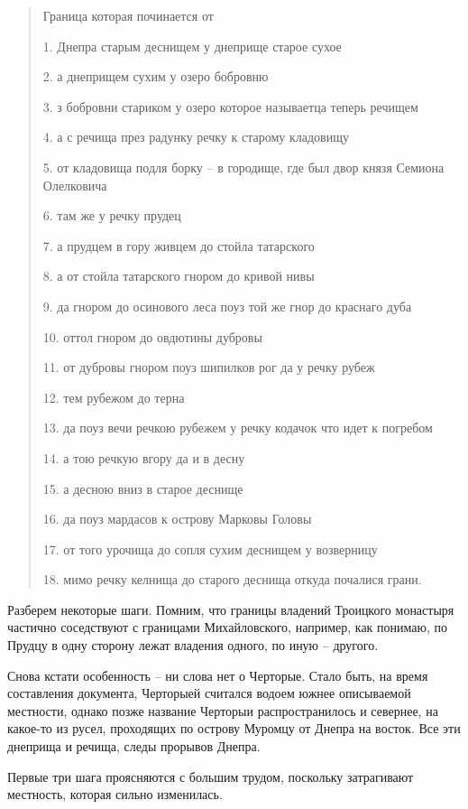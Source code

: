\begin{quotation}
Граница которая починается от 

1. Днепра старым деснищем у днеприще старое сухое

2. а днеприщем сухим у озеро бобровню 

3. з бобровни стариком у озеро которое называетца теперь речищем 

4. а с речища през радунку речку к старому кладовищу 

5. от кладовища подля борку – в городище, где был двор князя Семиона Олелковича

6. там же у речку прудец

7. а прудцем в гору живцем до стойла татарского

8. а от стойла татарского гнором до кривой нивы

9. да гнором до осинового леса поуз той же гнор до краснаго дуба

10. оттол гнором до овдютины дубровы

11. от дубровы гнором поуз шипилков рог да у речку рубеж

12. тем рубежом до терна

13. да поуз вечи речкою рубежем у речку кодачок что идет к погребом

14. а тою речкую вгору да и в десну

15. а десною вниз в старое деснище

16. да поуз мардасов к острову Марковы Головы

17. от того урочища до сопля сухим деснищем у возверницу 

18. мимо речку келнища до старого деснища откуда почалися грани.
\end{quotation}

Разберем некоторые шаги. Помним, что границы владений Троицкого монастыря частично соседствуют с границами Михайловского, например, как понимаю, по Прудцу в одну сторону лежат владения одного, по иную – другого.

Снова кстати особенность – ни слова нет о Черторые. Стало быть, на время составления документа, Черторыей считался водоем южнее описываемой местности, однако позже название Черторыи распространилось и севернее, на какое-то из русел, проходящих по острову Муромцу от Днепра на восток. Все эти днеприща и речища, следы прорывов Днепра.

Первые три шага проясняются с большим трудом, поскольку затрагивают местность, которая сильно изменилась.
 
